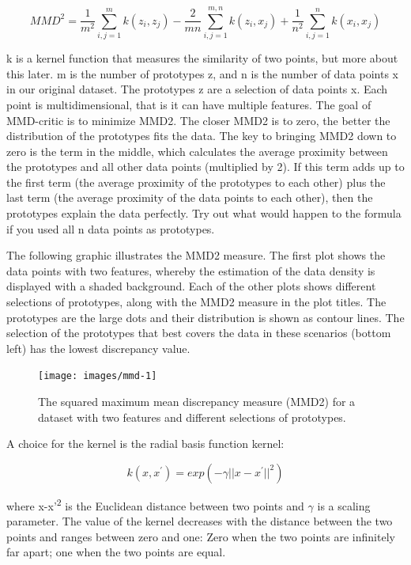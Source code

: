 \documentclass[
  12pt,
]{krantz}
\begin{document}
\[MMD^2=\frac{1}{m^2}\sum_{i,j=1}^m{}k(z_i,z_j)-\frac{2}{mn}\sum_{i,j=1}^{m,n}k(z_i,x_j)+\frac{1}{n^2}\sum_{i,j=1}^n{}k(x_i,x_j)\]

k is a kernel function that measures the similarity of two points, but more about this later.
m is the number of prototypes z, and n is the number of data points x in our original dataset.
The prototypes z are a selection of data points x.
Each point is multidimensional, that is it can have multiple features.
The goal of MMD-critic is to minimize MMD2.
The closer MMD2 is to zero, the better the distribution of the prototypes fits the data.
The key to bringing MMD2 down to zero is the term in the middle, which calculates the average proximity between the prototypes and all other data points (multiplied by 2).
If this term adds up to the first term (the average proximity of the prototypes to each other) plus the last term (the average proximity of the data points to each other), then the prototypes explain the data perfectly.
Try out what would happen to the formula if you used all n data points as prototypes.

The following graphic illustrates the MMD2 measure.
The first plot shows the data points with two features, whereby the estimation of the data density is displayed with a shaded background.
Each of the other plots shows different selections of prototypes, along with the MMD2 measure in the plot titles.
The prototypes are the large dots and their distribution is shown as contour lines.
The selection of the prototypes that best covers the data in these scenarios (bottom left) has the lowest discrepancy value.

\begin{figure}

{\centering \texttt{[image: images/mmd-1]} 

}

\caption{The squared maximum mean discrepancy measure (MMD2) for a dataset with two features and different selections of prototypes.}\label{fig:mmd}
\end{figure}

A choice for the kernel is the radial basis function kernel:

\[k(x,x^\prime)=exp\left(-\gamma||x-x^\prime||^2\right)\]

where \textbar\textbar x-x'\textbar\textbar{}\textsuperscript{2} is the Euclidean distance between two points and \(\gamma\) is a scaling parameter.
The value of the kernel decreases with the distance between the two points and ranges between zero and one:
Zero when the two points are infinitely far apart;
one when the two points are equal.
\end{document}
